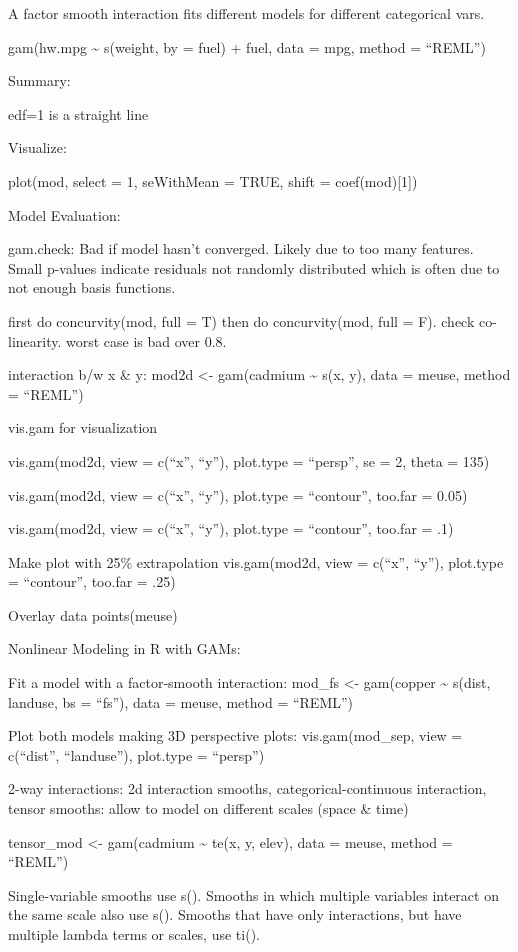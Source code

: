 \documentclass[]{book}
\begin{document}
A factor smooth interaction fits different models for different
categorical vars.

gam(hw.mpg \textasciitilde{} s(weight, by = fuel) + fuel, data = mpg,
method = ``REML'')

Summary:

edf=1 is a straight line

Visualize:

plot(mod, select = 1, seWithMean = TRUE, shift = coef(mod){[}1{]})

Model Evaluation:

gam.check: Bad if model hasn't converged. Likely due to too many
features. Small p-values indicate residuals not randomly distributed
which is often due to not enough basis functions.

first do concurvity(mod, full = T) then do concurvity(mod, full = F).
check co-linearity. worst case is bad over 0.8.

interaction b/w x \& y: mod2d \textless{}- gam(cadmium \textasciitilde{}
s(x, y), data = meuse, method = ``REML'')

vis.gam for visualization

vis.gam(mod2d, view = c(``x'', ``y''), plot.type = ``persp'', se = 2,
theta = 135)

vis.gam(mod2d, view = c(``x'', ``y''), plot.type = ``contour'', too.far
= 0.05)

vis.gam(mod2d, view = c(``x'', ``y''), plot.type = ``contour'', too.far
= .1)

Make plot with 25\% extrapolation vis.gam(mod2d, view = c(``x'', ``y''),
plot.type = ``contour'', too.far = .25)

Overlay data points(meuse)

Nonlinear Modeling in R with GAMs:

Fit a model with a factor-smooth interaction: mod\_fs \textless{}-
gam(copper \textasciitilde{} s(dist, landuse, bs = ``fs''), data =
meuse, method = ``REML'')

Plot both models making 3D perspective plots: vis.gam(mod\_sep, view =
c(``dist'', ``landuse''), plot.type = ``persp'')

2-way interactions: 2d interaction smooths, categorical-continuous
interaction, tensor smooths: allow to model on different scales (space
\& time)

tensor\_mod \textless{}- gam(cadmium \textasciitilde{} te(x, y, elev),
data = meuse, method = ``REML'')

Single-variable smooths use s(). Smooths in which multiple variables
interact on the same scale also use s(). Smooths that have only
interactions, but have multiple lambda terms or scales, use ti().
\end{document}
